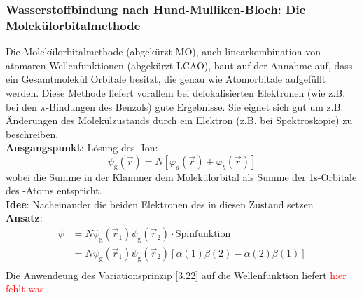 \subsubsection{Wasserstoffbindung nach Hund-Mulliken-Bloch: Die Molekülorbitalmethode}
Die Molekülorbitalmethode (abgekürzt MO), auch linearkombination von atomaren Wellenfunktionen (abgekürzt LCAO), baut auf der Annahme auf, dass ein Gesamtmolekül Orbitale besitzt, die genau wie Atomorbitale aufgefüllt werden. Diese Methode liefert vorallem bei delokalisierten Elektronen (wie z.B. bei den $ \pi$-Bindungen des Benzols) gute Ergebnisse. Sie eignet sich gut um z.B. Änderungen des Molekülzustands durch ein Elektron (z.B. bei Spektroskopie) zu beschreiben.\\
\textbf{Ausgangspunkt}: Lösung des -Ion:
\begin{equation}
	\label{3.59}
	\psi_{\mathrm{g}} \left( \Vec{r} \right) = N\left[ \varphi_{a}\left( \Vec{r} \right) + \varphi_{b} \left( \Vec{r} \right)  \right] 
\end{equation}
wobei die Summe in der Klammer dem Molekülorbital als Summe der 1s-Orbitale des -Atoms entspricht.\\
\textbf{Idee}: Nacheinander die beiden Elektronen des  in diesen Zustand setzen\\
\textbf{Ansatz}:
\begin{equation}
	\label{3.60}
	\begin{split}
		\psi &=  N \psi_{\mathrm{g}} \left( \Vec{r}_{1} \right) \psi_{\mathrm{g}} \left( \Vec{r}_{2}\right) \cdot \text{Spinfunktion}  \\
		     &= N \psi_{\mathrm{g}} \left( \Vec{r}_{1} \right) \psi_{\mathrm{g}} \left( \Vec{r}_{2} \right) \left[ \alpha ( 1 ) \beta(2) - \alpha(2) \beta (1)  \right]  \\
	\end{split}
\end{equation}
Die Anwendeung des Variationsprinzip \ref{3.22} auf die Wellenfunktion liefert \textcolor{red}{hier fehlt was}

